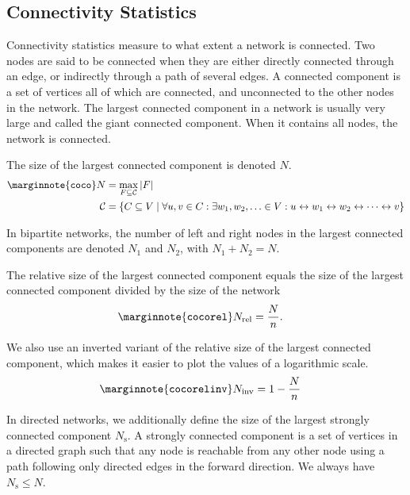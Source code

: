 \documentclass{article}
\begin{document}
\subsection{Connectivity Statistics}
Connectivity statistics measure to what extent a network is
connected. 
Two nodes are said to be connected when they are either directly
connected through an edge, or indirectly through a path of several
edges. 
A connected component is a set of vertices all of which are connected,
and unconnected to the other nodes in the network.  
The largest connected component in a network is usually very large and
called the giant connected component. When it contains all nodes, the
network is connected. 

The size of the largest connected component is denoted 
$N$.  
\begin{align}
  \marginnote{\texttt{coco}}
  N &= \max_{F \subseteq \mathcal C} |F|  \\
  \mathcal C &= \{ C \subseteq V \mid \forall u, v \in C:  \exists w_1,
  w_2, \ldots \in V:  u \leftrightarrow w_1 \leftrightarrow w_2 \leftrightarrow \cdots \leftrightarrow v \} \nonumber
\end{align}

In bipartite networks, the number of left and right nodes in the largest
connected components are denoted $N_1$ and $N_2$,
with $N_1 + N_2 = N$. 

The relative size of the largest connected component equals the
size of the largest connected component divided by the size of the
network
\begin{align}
  \marginnote{\texttt{cocorel}}
  N_{\mathrm{rel}} &= \frac N n. 
\end{align}

We also use an inverted variant of the relative size of the largest
connected component, which makes it easier to plot the values of a
logarithmic scale.
\begin{align}
  \marginnote{\texttt{cocorelinv}}
  N_{\mathrm{inv}} &= 1 - \frac N n 
\end{align}

In directed networks, we additionally define the size of the largest
strongly connected component $N_{\mathrm s}$.  A strongly
connected component is a 
set of vertices in a directed graph such that any node is reachable from
any other node using a path following only directed edges in the forward
direction.   We always have $N_{\mathrm s} \leq N$. 
\end{document}
